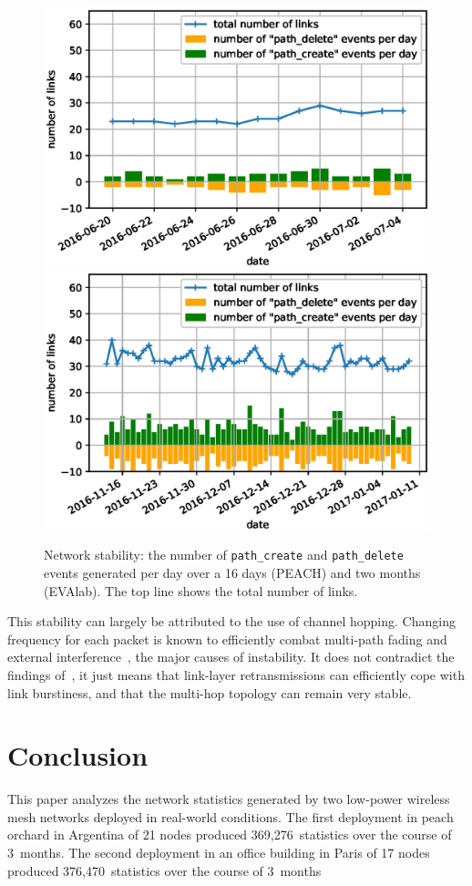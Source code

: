 \documentclass{elsarticle}
\newcommand{\pathcreate}          {{\tt path\_create}\xspace}
\newcommand{\pathdelete}          {{\tt path\_delete}\xspace}
\newcommand{\PEACHNUMSTATS}       {369,276\xspace}
\newcommand{\EVANUMSTATS}   	  {376,470\xspace}
\begin{document}
\begin{figure}
    \includegraphics[width=0.5\columnwidth]{net_churn_peach.eps}
    \includegraphics[width=0.5\columnwidth]{net_churn.eps}
    \caption{
        Network stability: the number of \pathcreate and \pathdelete events generated per day over a 16 days (PEACH) and two months (EVAlab).
        The top line shows the total number of links.
    }
    \label{fig:net_churn}
\end{figure}


This stability can largely be attributed to the use of channel hopping.
Changing frequency for each packet is known to efficiently combat multi-path fading and external interference~\cite{watteyne09reliability}, the major causes of instability.
It does not contradict the findings of~\cite{srinivasan08beta}, it just means that link-layer retransmissions can efficiently cope with link burstiness, and that the multi-hop topology can remain very stable.

\section{Conclusion}
\label{sec:conclusion}


This paper analyzes the network statistics generated by two low-power wireless mesh networks deployed in real-world conditions.
The first deployment in peach orchard in Argentina of 21 nodes produced \PEACHNUMSTATS~statistics over the course of 3~months.
The second deployment in an office building in Paris of 17 nodes produced \EVANUMSTATS~statistics over the course of 3~months
\end{document}
